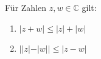 Für Zahlen $z, w \in \mathbb{C}$ gilt:
\begin{enumerate}
    \item $|z+w| \leq |z| + |w|$
    \item $||z|-|w|| \leq |z-w|$
\end{enumerate}